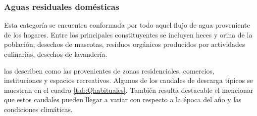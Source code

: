 \subsubsection{Aguas residuales domésticas}
Esta categoría se encuentra conformada por todo aquel flujo de agua proveniente de los hogares. Entre los principales constituyentes se incluyen heces y orina de la población; desechos de mascotas, residuos orgánicos producidos por actividades culinarias, desechos de lavandería.\par
\cite{crites2000} las describen como las provenientes de zonas residenciales, comercios, instituciones y espacios recreativos. Algunos de los caudales de descarga típicos se muestran en el cuadro \ref{tab:Qhabituales}. También resulta destacable el mencionar que estos caudales pueden llegar a variar con respecto a la época del año y las condiciones climáticas.\par
